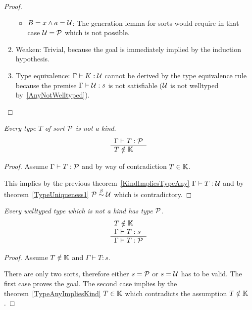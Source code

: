 \begin{theorem}
\begin{proof}
\begin{enumerate}
\begin{itemize}
            \item $B = x \land a = {\cal U}$: The generation lemma for sorts would
                require in that case ${\cal U} = {\cal P}$ which is not possible.
            \end{itemize}

        \item Weaken: Trivial, because the goal is immediately implied by the
            induction hypothesis.

        \item Type equivalence:
            $\Gamma \vdash K : {\cal U}$ cannot be derived by the type equivalence
            rule because the premise $\Gamma \vdash {\cal U} : s$ is not satisfiable
            (${\cal U}$ is not welltyped by~\ref{AnyNotWelltyped}).
        \end{enumerate}
    \end{proof}
\end{theorem}



\begin{corollary}
    \label{TypePropImpliesNotKind}
    \emph{Every type $T$ of sort ${\cal P}$ is not a kind}.
    $$
    \begin{array}{l} 
        \Gamma \vdash T : {\cal P}
     \\ \hline 
        T \notin \mathbb{K}
    \end{array}
    $$
    \begin{proof}
        Assume $\Gamma \vdash T : {\cal P}$ and by way of contradiction $T \in
        \mathbb{K}$.

        This implies by the previous theorem~\ref{KindImpliesTypeAny} $\Gamma
        \vdash T : {\cal U}$ and by theorem~\ref{TypeUniqueness1} ${\cal P} \stackrel{\beta}{\sim}
        {\cal U}$ which is contradictory.
    \end{proof}
\end{corollary}




\begin{corollary}
    \label{NotKindImpliesProp}
    \emph{Every welltyped type which is not a kind has type ${\cal P}$}.
    $$
    \begin{array}{l} 
        T \notin \mathbb{K}
        \\
        \Gamma \vdash T : s
     \\ \hline 
        \Gamma \vdash T : {\cal P}
    \end{array}
    $$
    \begin{proof}
        Assume $T \notin \mathbb{K}$ and $\Gamma \vdash T : s$.

        There are only two sorts, therefore either $s = {\cal P}$ or $s = {\cal U}$
        has to be valid. The first case proves the goal. The second case implies
        by the theorem~\ref{TypeAnyImpliesKind} $T \in \mathbb{K}$ which
        contradicts the assumption $T\notin \mathbb{K}$.
    \end{proof}
\end{corollary}




